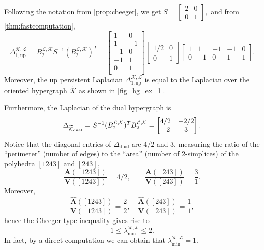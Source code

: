 \documentclass{article}
\theoremstyle{definition}
\newcommand{\KK}{\mathcal{K}}
\newcommand{\LL}{\mathcal{L}}
\begin{document}
%

Following the notation from \cref{prop:cheeger}, we get
$
S
=
\begin{bmatrix}
    2 & 0\\
    0 & 1
\end{bmatrix},$ and from \cref{thm:fastcomputation},
\[
\Delta_{1, \mathrm{up}}^{\KK, \LL}
=
B_2^{\LL, \KK} S^{-1} (B_2^{\LL, \KK})^T
=
\begin{bmatrix}
 1 & 0 \\
 1 & -1 \\
 -1 & 0 \\
 -1 & 1 \\
 0 & 1 \\
\end{bmatrix}
\begin{bmatrix}
    1/2 & 0\\
    0 & 1
\end{bmatrix}
\begin{bmatrix}
    1 & 1 & -1 & -1 & 0\\
    0 & -1 & 0 & 1 & 1
\end{bmatrix}.
\]
Moreover,
the up persistent Laplacian $\Delta_{1, \mathrm{up}}^{\KK, \LL}$ is equal to the Laplacian over the oriented hypergraph $\widetilde{\KK}$ as shown in \cref{fig_hg_ex_1}.

Furthermore, the Laplacian of the dual hypergraph is 
\[
\Delta_{\widetilde{\KK}_{\textrm{\textrm{dual}}}}
=
S^{-1} (B_2^{\LL, \KK})^T B_2^{\LL, \KK} 
=
\begin{bmatrix}
    4/2 & -2/2\\
    -2 & 3
\end{bmatrix}.
\]
Notice that the diagonal entries of $\Delta_{\mathrm{dual}}$ are $4/2$ and $3$, measuring the ratio of the ``perimeter'' (number of edges) to the ``area'' (number of 2-simplices) of the polyhedra $[1243]$ and $[243]$,
\[
\frac{\mathbf{A}([1243])}{\mathbf{V}([1243])} = 4/2, \qquad \frac{\mathbf{A}([243])}{\mathbf{V}([243])}=\frac{3}{1}.
\]
Moreover,
\[
\frac{\widehat{\mathbf{A}}([1243])}{\mathbf{V}([1243])}=\frac{2}{2},
\quad
\frac{\widehat{\mathbf{A}}([243])}{\mathbf{V}([243])}=\frac{1}{1},
\]
hence the Cheeger-type inequality gives rise to
\[
1\leq \lambda_{\min}^{\KK, \LL}\leq 2.
\]
In fact,
by a direct computation we can obtain that $\lambda_{\min}^{\KK, \LL}=1$.
\end{document}
